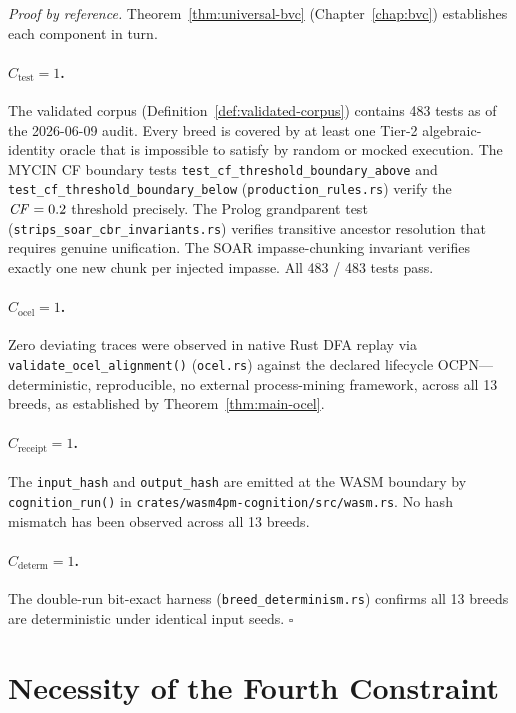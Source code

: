 \noindent\textit{Proof by reference.} Theorem~\ref{thm:universal-bvc}
(Chapter~\ref{chap:bvc}) establishes each component in turn.

\paragraph{$C_{\mathrm{test}} = 1$.}
The validated corpus (Definition~\ref{def:validated-corpus}) contains 483 tests as of
the 2026-06-09 audit. Every breed is covered by at least one Tier-2 algebraic-identity
oracle that is impossible to satisfy by random or mocked execution. The MYCIN CF boundary
tests \texttt{test\_cf\_threshold\_boundary\_above} and
\texttt{test\_cf\_threshold\_boundary\_below} (\texttt{production\_rules.rs}) verify the
$\mathit{CF} = 0.2$ threshold precisely. The Prolog grandparent test
(\texttt{strips\_soar\_cbr\_invariants.rs}) verifies transitive ancestor resolution that
requires genuine unification. The SOAR impasse-chunking invariant verifies exactly one
new chunk per injected impasse. All 483 / 483 tests pass.

\paragraph{$C_{\mathrm{ocel}} = 1$.}
Zero deviating traces were observed in native Rust DFA replay via \texttt{validate\_ocel\_alignment()} (\texttt{ocel.rs}) against the declared lifecycle OCPN---deterministic, reproducible, no external process-mining framework, across all 13 breeds,
as established by Theorem~\ref{thm:main-ocel}.

\paragraph{$C_{\mathrm{receipt}} = 1$.}
The \texttt{input\_hash} and \texttt{output\_hash} are emitted at the WASM boundary by
\texttt{cognition\_run()} in \texttt{crates/wasm4pm-cognition/src/wasm.rs}.
No hash mismatch has been observed across all 13 breeds.

\paragraph{$C_{\mathrm{determ}} = 1$.}
The double-run bit-exact harness (\texttt{breed\_determinism.rs}) confirms all 13 breeds
are deterministic under identical input seeds. $\square$

\section{Necessity of the Fourth Constraint}
\label{sec:thm-fourth}

